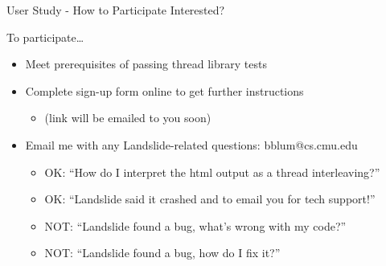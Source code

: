 \documentclass[xcolor=dvipsnames]{beamer}
\begin{document}
\begin{frame}{User Study - How to Participate}
	Interested?
	\linegap

	To participate\dots
	\begin{itemize}
		\item Meet prerequisites of passing thread library tests
		\item Complete sign-up form online to get further instructions
			\begin{itemize}
				\item (link will be emailed to you soon)
			\end{itemize}
		\item Email me with any Landslide-related questions: {\sf bblum@cs.cmu.edu}
			\begin{itemize}
				\item OK: ``How do I interpret the html output as a thread interleaving?''
				\item OK: ``Landslide said it crashed and to email you for tech support!''
				\item NOT: ``Landslide found a bug, what's wrong with my code?''
				\item NOT: ``Landslide found a bug, how do I fix it?''
			\end{itemize}
	\end{itemize}

\end{frame}

\end{document}
